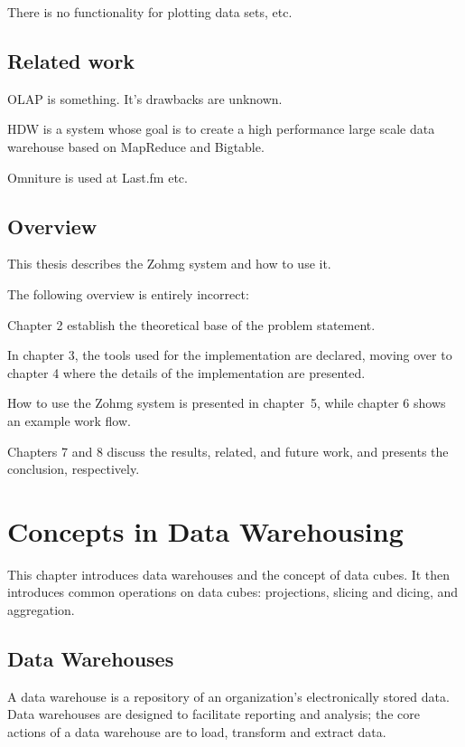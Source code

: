 There is no functionality for plotting data sets, etc.



\section{Related work}


OLAP is something. It's drawbacks are unknown.

HDW is a system whose goal is to create a high performance large scale data
warehouse based on MapReduce and Bigtable. \cite{hdw}

Omniture is used at Last.fm etc.


\section{Overview}

This thesis describes the Zohmg system and how to use it.

The following overview is entirely incorrect:

Chapter 2 establish the theoretical base of the problem statement.

In chapter 3, the tools used for the implementation are declared, moving
over to chapter 4 where the details of the implementation are presented.

How to use the Zohmg system is presented in chapter~5, while chapter 6
shows an example work flow.

Chapters 7 and 8 discuss the results, related, and future work, and
presents the conclusion, respectively.



\chapter{Concepts in Data Warehousing}

This chapter introduces data warehouses and the concept of data cubes. It then
introduces common operations on data cubes: projections, slicing and dicing,
and aggregation.


\section{Data Warehouses}

A data warehouse is a repository of an organization's electronically stored
data. Data warehouses are designed to facilitate reporting and analysis; the
core actions of a data warehouse are to load, transform and extract data.

